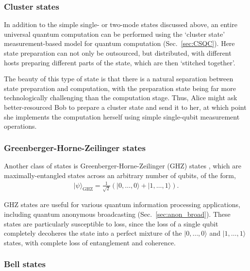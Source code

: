 \documentclass[aps,rmp,twocolumn,amsmath,amssymb,nofootinbib,superscriptaddress,longbibliography,floatfix]{revtex4-1}
\newcommand{\ket}[1]{|#1\rangle}
\begin{document}
%
%

\subsubsection{Cluster states}

In addition to the simple single- or two-mode states discussed above, an entire universal quantum computation can be performed using the `cluster state' measurement-based model for quantum computation (Sec.~\ref{sec:CSQC}). Here state preparation can not only be outsourced, but distributed, with different hosts preparing different parts of the state, which are then `stitched together'.

The beauty of this type of state is that there is a natural separation between state preparation and computation, with the preparation state being far more technologically challenging than the computation stage. Thus, Alice might ask better-resourced Bob to prepare a cluster state and send it to her, at which point she implements the computation herself using simple single-qubit measurement operations.

%
%

\subsubsection{Greenberger-Horne-Zeilinger states}

Another class of states is Greenberger-Horne-Zeilinger (GHZ) states \cite{bib:GHZ89}, which are maximally-entangled states across an arbitrary number of qubits, of the form,
\begin{align}
\ket\psi_\mathrm{GHZ} = \frac{1}{\sqrt{2}}(\ket{0,\dots,0} + \ket{1,\dots,1}).
\end{align}

GHZ states are useful for various quantum information processing applications, including quantum anonymous broadcasting (Sec.~\ref{sec:anon_broad}). These states are particularly susceptible to loss, since the loss of a single qubit completely decoheres the state into a perfect mixture of the \mbox{$\ket{0,\dots,0}$} and \mbox{$\ket{1,\dots,1}$} states, with complete loss of entanglement and coherence.

%
%

\subsubsection{Bell states} \label{sec:bell_state_res}
\end{document}
